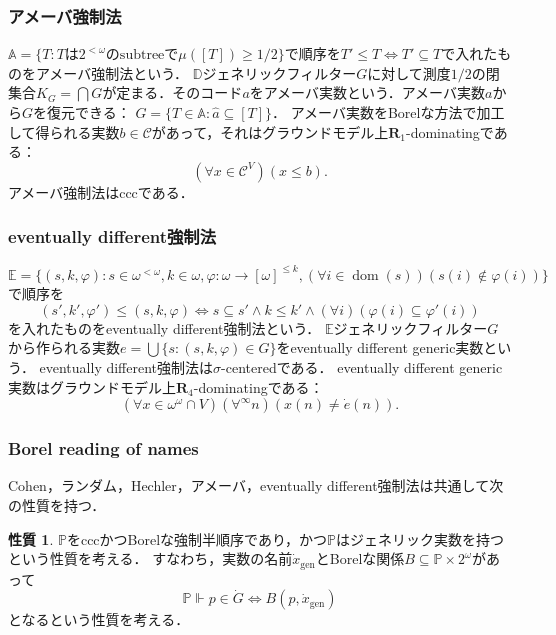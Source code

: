 \documentclass[uplatex,dvipdfmx]{jsarticle}
\renewcommand{\P}{\mathbb{P}}
\newcommand{\dom}{\operatorname{dom}}
\newcommand\forces{\Vdash}
\newcommand{\relR}{\mathbf{R}}
\renewcommand\subset{\subseteq}
\theoremstyle{definition}
\newtheorem{property}[thm]{性質}
\begin{document}
		\subsubsection{アメーバ強制法}
		
		$\mathbb{A} = \{ T : T\text{は}2^{<\omega}\text{のsubtreeで}\mu([T])\ge 1/2 \}$で順序を$T' \le T \iff T' \subset T$で入れたものをアメーバ強制法という．
		$\mathbb{D}$ジェネリックフィルター$G$に対して測度$1/2$の閉集合$K_G = \bigcap G$が定まる．そのコード$a$をアメーバ実数という．アメーバ実数$a$から$G$を復元できる： $G = \{ T \in \mathbb{A} : \hat{a} \subset [T] \}$．
		アメーバ実数をBorelな方法で加工して得られる実数$b \in \mathcal{C}$があって，それはグラウンドモデル上$\relR_1$-dominatingである：
		\[
		(\forall x \in \mathcal{C}^V) (x \le b).
		\]
		アメーバ強制法はcccである．
		
		\subsubsection{eventually different強制法}
		
		$\mathbb{E} = \{ (s,k,\varphi) : s \in \omega^{<\omega}, k \in \omega, \varphi \colon \omega \to [\omega]^{\le k}, (\forall i \in \dom(s))(s(i) \not \in \varphi(i)) \}$で順序を
		\[
		(s', k', \varphi') \le (s, k, \varphi) \iff s \subset s' \land k \le k' \land (\forall i)(\varphi(i) \subset \varphi'(i))
		\]
		を入れたものをeventually different強制法という．	
		$\mathbb{E}$ジェネリックフィルター$G$から作られる実数$e = \bigcup \{ s  : (s, k, \varphi) \in G \}$をeventually different generic実数という．
		eventually different強制法は$\sigma$-centeredである．
		eventually different generic実数はグラウンドモデル上$\relR_4$-dominatingである：
		\[
		(\forall x \in \omega^\omega \cap V)(\forall^\infty n)(x(n) \ne \dot{e}(n)).
		\]
		
		\subsubsection{Borel reading of names}
		
		Cohen，ランダム，Hechler，アメーバ，eventually different強制法は共通して次の性質を持つ．
		
		\begin{property}\label{property:hasgenericreal}
			$\P$をcccかつBorelな強制半順序であり，かつ$\P$はジェネリック実数を持つという性質を考える．
			すなわち，実数の名前$\dot{x}_\mathrm{gen}$とBorelな関係$B \subset \P \times 2^\omega$があって
			\[
			\P \forces p \in \dot{G} \iff B(p, \dot{x}_\mathrm{gen})
			\]
			となるという性質を考える．
		\end{property}
	
\end{document}
